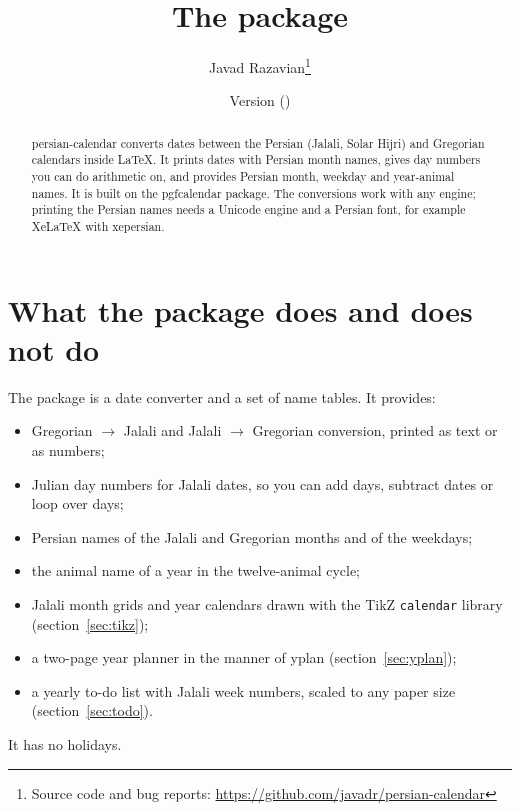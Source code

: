 \documentclass[11pt]{article}
\title{The \pkg{persian-calendar} package}
\author{Javad Razavian\thanks{Source code and bug reports:
  \url{https://github.com/javadr/persian-calendar}}}
\date{Version \pcalendarversion\quad(\pcalendardate)}
\newcommand\pkg[1]{\textsf{#1}}
\begin{document}
\latin %
\leftfootnoterule %

\maketitle

\begin{abstract}\noindent
\pkg{persian-calendar} converts dates between the Persian (Jalali, Solar Hijri) and Gregorian calendars
inside \LaTeX{}. It prints dates with Persian month names, gives day numbers you can do arithmetic
on, and provides Persian month, weekday and year-animal names. It is built on the \pkg{pgfcalendar}
package. The conversions work with any engine; printing the Persian names needs a Unicode
engine and a Persian font, for example XeLaTeX with \pkg{xepersian}.
\end{abstract}

\tableofcontents

\section{What the package does and does not do}\label{sec:what1}

The package is a date converter and a set of name tables. It provides:
\begin{itemize}
  \item Gregorian $\to$ Jalali and Jalali $\to$ Gregorian conversion, printed as text or as numbers;
  \item Julian day numbers for Jalali dates, so you can add days, subtract dates or loop over days;
  \item Persian names of the Jalali and Gregorian months and of the weekdays;
  \item the animal name of a year in the twelve-animal cycle;
  \item Jalali month grids and year calendars drawn with the \pkg{TikZ} \texttt{calendar} library
    (section~\ref{sec:tikz});
  \item a two-page year planner in the manner of \pkg{yplan} (section~\ref{sec:yplan});
  \item a yearly to-do list with Jalali week numbers, scaled to any paper size (section~\ref{sec:todo}).
\end{itemize}
It has no holidays.
\end{document}
